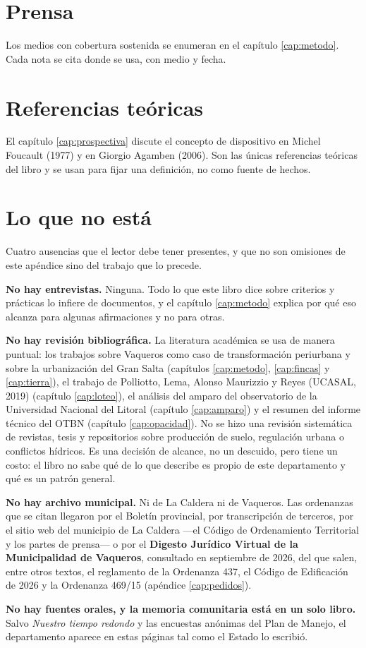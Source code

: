 \section{Prensa}

Los medios con cobertura sostenida se enumeran en el capítulo \ref{cap:metodo}. Cada nota se cita donde se usa, con medio y fecha.

\section{Referencias teóricas}

El capítulo \ref{cap:prospectiva} discute el concepto de dispositivo en Michel Foucault (1977) y en Giorgio Agamben (2006). Son las únicas referencias teóricas del libro y se usan para fijar una definición, no como fuente de hechos.

\section{Lo que no está}

\begin{cautela}
Cuatro ausencias que el lector debe tener presentes, y que no son omisiones de este apéndice
sino del trabajo que lo precede.

\textbf{No hay entrevistas.} Ninguna. Todo lo que este libro dice sobre criterios y prácticas
lo infiere de documentos, y el capítulo \ref{cap:metodo} explica por qué eso alcanza para
algunas afirmaciones y no para otras.

\textbf{No hay revisión bibliográfica.} La literatura académica se usa de manera puntual: los trabajos sobre Vaqueros como caso de transformación periurbana y sobre la urbanización del Gran Salta (capítulos \ref{cap:metodo}, \ref{cap:fincas} y \ref{cap:tierra}), el trabajo de Polliotto, Lema, Alonso Maurizzio y Reyes (UCASAL, 2019) (capítulo \ref{cap:loteo}), el análisis del amparo del observatorio de la Universidad Nacional del Litoral (capítulo \ref{cap:amparo}) y el resumen del informe técnico del OTBN (capítulo \ref{cap:opacidad}). No se hizo una revisión sistemática de revistas, tesis y repositorios sobre producción de suelo, regulación urbana o conflictos hídricos. Es una decisión de alcance, no un descuido, pero tiene un costo: el libro no sabe qué de lo que describe es propio de este departamento y qué
es un patrón general.

\textbf{No hay archivo municipal.} Ni de La Caldera ni de Vaqueros. Las ordenanzas que se citan llegaron por el Boletín provincial, por transcripción de terceros, por el sitio web del municipio de La Caldera ---el Código de Ordenamiento Territorial y los partes de prensa--- o por el \textbf{Digesto Jurídico Virtual de la Municipalidad de Vaqueros}, consultado en septiembre de 2026, del que salen, entre otros textos, el reglamento de la Ordenanza 437, el Código de Edificación de 2026 y la Ordenanza 469/15 (apéndice \ref{cap:pedidos}).

\textbf{No hay fuentes orales, y la memoria comunitaria está en un solo libro.} Salvo \textit{Nuestro tiempo redondo} y las encuestas anónimas del Plan de Manejo, el departamento aparece en estas
páginas tal como el Estado lo escribió.
\end{cautela}
